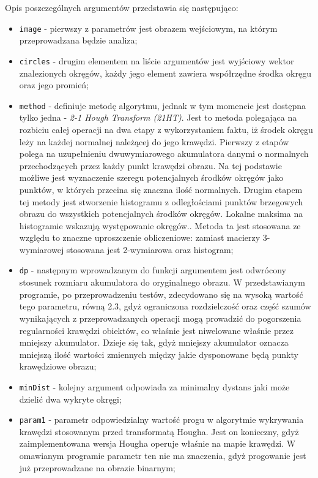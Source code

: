 Opis poszczególnych argumentów przedstawia się następująco:
\begin{itemize}
\item \texttt{image} - pierwszy z parametrów jest obrazem wejściowym, na którym przeprowadzana będzie analiza;
\item \texttt{circles} - drugim elementem na liście argumentów jest wyjściowy wektor znalezionych okręgów, każdy jego element zawiera współrzędne środka okręgu oraz jego promień;
\item \texttt{method} - definiuje metodę algorytmu, jednak w tym momencie jest dostępna tylko jedna - \textit{2-1 Hough Transform (21HT)}. Jest to metoda polegająca na rozbiciu całej operacji na dwa etapy z wykorzystaniem faktu, iż środek okręgu leży na każdej normalnej należącej do jego krawędzi. Pierwszy z etapów polega na uzupełnieniu dwuwymiarowego akumulatora danymi o normalnych przechodzących przez każdy punkt krawędzi obrazu. Na tej podstawie możliwe jest wyznaczenie szeregu potencjalnych środków okręgów jako punktów, w których przecina się znaczna ilość normalnych. Drugim etapem tej metody jest stworzenie histogramu z odległościami punktów brzegowych obrazu do wszystkich potencjalnych środków okręgów. Lokalne maksima na histogramie wskazują występowanie okręgów.\cite{Yuen}. Metoda ta jest stosowana ze względu to znaczne uproszczenie obliczeniowe: zamiast macierzy 3-wymiarowej stosowana jest 2-wymiarowa oraz histogram;
\item \texttt{dp} - następnym wprowadzanym do funkcji argumentem jest odwrócony stosunek rozmiaru akumulatora do oryginalnego obrazu. W przedstawianym programie, po przeprowadzeniu testów, zdecydowano się na wysoką wartość tego parametru, równą 2.3, gdyż ograniczona rozdzielczość oraz część szumów wynikających z przeprowadzanych operacji mogą prowadzić do pogorszenia regularności krawędzi obiektów, co właśnie jest niwelowane właśnie przez mniejszy akumulator. Dzieje się tak, gdyż mniejszy akumulator oznacza mniejszą ilość wartości  zmiennych między jakie dysponowane będą punkty krawędziowe obrazu;
\item \texttt{minDist} - kolejny argument odpowiada za minimalny dystans jaki może dzielić dwa wykryte okręgi;
\item \texttt{param1} - parametr odpowiedzialny wartość progu w algorytmie wykrywania krawędzi stosowanym przed transformatą Hougha. Jest on konieczny, gdyż zaimplementowana wersja Hougha operuje właśnie na mapie krawędzi. W omawianym programie parametr ten nie ma znaczenia, gdyż progowanie jest już przeprowadzane na obrazie binarnym;

\end{itemize}
